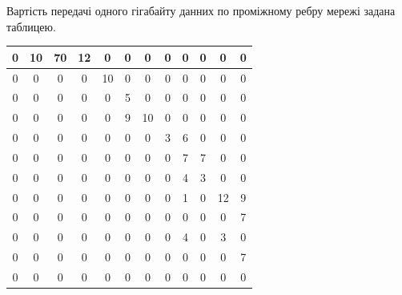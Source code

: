 \documentclass[a4paper,14pt,russian,ukrainian,oneside,final]{extreport}
\begin{document}
Вартість передачі одного гігабайту данних по проміжному ребру мережі задана таблицею.
\begin{center}
\begin{tabular}{|c|c|c|c|c|c|c|c|c|c|c|c|}
\hline
0&10&70&12&0&0&0&0&0&0&0&0\\ \hline
0&0&0&0&10&0&0&0&0&0&0&0  \\ \hline
0&0&0&0&0&5&0&0&0&0&0&0   \\ \hline
0&0&0&0&0&9&10&0&0&0&0&0  \\ \hline
0&0&0&0&0&0&0&3&6&0&0&0   \\ \hline
0&0&0&0&0&0&0&0&7&7&0&0   \\ \hline
0&0&0&0&0&0&0&0&4&3&0&0   \\ \hline
0&0&0&0&0&0&0&0&1&0&12&9  \\ \hline
0&0&0&0&0&0&0&0&0&0&0&7   \\ \hline
0&0&0&0&0&0&0&0&4&0&3&0   \\ \hline
0&0&0&0&0&0&0&0&0&0&0&7   \\ \hline
0&0&0&0&0&0&0&0&0&0&0&0   \\ \hline
\end{tabular}
\end{center}
\end{document}
